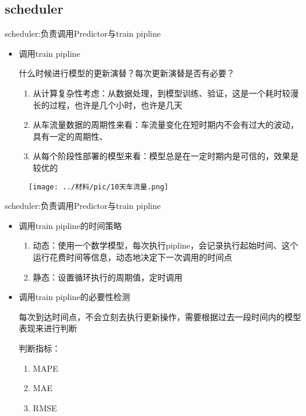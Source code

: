 \documentclass[notheorems, aspectratio=1610]{beamer}
\begin{document}
\subsection{scheduler}
\begin{frame}
    scheduler:负责调用Predictor与train pipline
    \begin{itemize}
        \item 调用train pipline\par
        \small 什么时候进行模型的更新演替？每次更新演替是否有必要？
        \begin{enumerate}
            \item 从计算复杂性考虑：从数据处理，到模型训练、验证，这是一个耗时较漫长的过程，也许是几个小时，也许是几天
            \item 从车流量数据的周期性来看：车流量变化在短时期内不会有过大的波动，具有一定的周期性、
            \item 从每个阶段性部署的模型来看：模型总是在一定时期内是可信的，效果是较优的
        \end{enumerate}
    \end{itemize}
    \begin{figure}[h] %
        \centering %
        \texttt{[image: ../材料/pic/10天车流量.png]} %
    \end{figure}%
\end{frame}
\begin{frame}
    scheduler:负责调用Predictor与train pipline
    \begin{itemize}
        \item 调用train pipline的时间策略\par
        \begin{enumerate}
            \item 动态：使用一个数学模型，每次执行pipline，会记录执行起始时间、这个运行花费时间等信息，动态地决定下一次调用的时间点
            \item 静态：设置循环执行的周期值，定时调用
        \end{enumerate}
        \item 调用train pipline的必要性检测\par
        每次到达时间点，不会立刻去执行更新操作，需要根据过去一段时间内的模型表现来进行判断
        \par
        \hspace*{\fill}
        \par
        判断指标：
        \begin{enumerate}
            \item MAPE
            \item MAE
            \item RMSE
        \end{enumerate}
    \end{itemize}
\end{frame}
\end{document}
